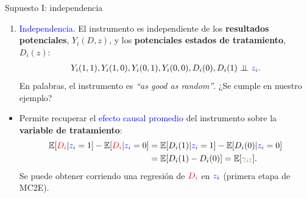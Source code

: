 \documentclass[10pt, xcolor=dvipsnames]{beamer}
\begin{document}
\begin{frame}{Supuesto I: independencia}
	\begin{enumerate}
		\item[I.] \textcolor{blue}{Independencia.} El instrumento es independiente de los \textbf{resultados potenciales}, $Y_i(D,z)$, y los \textbf{potenciales estados de tratamiento}, $D_i(z)$: 		
        \vspace{-1em}
		\begin{align*}
		Y_i(1,1), Y_i(1,0), Y_i(0,1), Y_i(0,0),D_i(0), D_i(1) \perp \!\!\! \perp \textcolor{blue}{z_i}. 
		\end{align*}			
	    En palabras, el instrumento es \textit{``as good as random''}. ¿Se cumple en nuestro ejemplo?
    \end{enumerate}
\begin{itemize}
\smallspace	
	\item Permite recuperar el \textcolor{blue}{efecto causal promedio} del instrumento sobre la \textbf{variable de tratamiento}:	
	\begin{align*}
	\begin{split}
	\operatorname{\mathbb{E}}[\textcolor{red}{D_i}|\textcolor{blue}{z_i} =1] - \operatorname{\mathbb{E}}[\textcolor{red}{D_i}|\textcolor{blue}{z_i} =0] &=  \operatorname{\mathbb{E}}[D_i(1)|\textcolor{blue}{z_i} =1] - \operatorname{\mathbb{E}}[D_i(0)|\textcolor{blue}{z_i} =0]\\
	&= \operatorname{\mathbb{E}}[D_i(1) - D_i(0)] = \operatorname{\mathbb{E}}[\textcolor{brown}{\gamma_{i1}}]. 
	\end{split}
	\end{align*}
	Se puede obtener corriendo una regresión de $\textcolor{red}{D_i}$ en $\textcolor{blue}{z_i} $ (primera etapa de MC2E).
\end{itemize}	
\end{frame}
\end{document}
